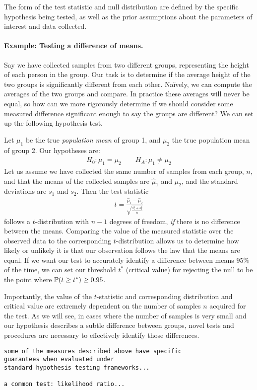 The form of the test statistic and null distribution
are defined by the specific hypothesis being tested,
as well as the prior assumptions about the parameters
of interest and data collected.

\paragraph{Example: Testing a difference of means.} 
Say we have collected samples from two different groups,
representing the height of each person in the group.
Our task is to determine if the average height
of the two groups is significantly different from each other.
Na\"ively, we can compute the averages of the two groups and compare.
In practice these averages will never be equal, so how can we 
more rigorously determine if we should consider some measured difference
significant enough to say the groups are different?
We can set up the following hypothesis test.

Let $\mu_1$ be the true \textit{population mean} of group 1,
and $\mu_2$ the true population mean of group 2.
Our hypotheses are:
\begin{align}
H_0: \mu_1 = \mu_2 \qquad H_A: \mu_1 \neq \mu_2
\end{align}
Let us assume we have collected the same number of samples from each group,
$n$, and that the means of the collected samples are $\hat{\mu}_1$ and $\hat{\mu}_2$,
and the standard deviations are $s_1$ and $s_2$.
Then the test statistic
\begin{align}
t = \frac{\hat{\mu}_1 - \hat{\mu}_2}{\sqrt{\frac{s_1^2 + s_2^2}{n}}}
\end{align}
follows a $t$-distribution with $n-1$ degrees of freedom,
\textit{if} there is no difference between the means.
Comparing the value of the measured statistic over the observed data
to the corresponding $t$-distribution allows
us to determine how likely or unlikely it is that 
our observation follows the law that the means are equal.
If we want our test to accurately identify
a difference between means 95\% of the time,
we can set our threshold $t^*$ (critical value) for rejecting the null
to be the point where $\mathbb{P}(t \geq t^*) \geq 0.95$.

Importantly, the value of the $t$-statistic and corresponding
distribution and critical value are extremely
dependent on the number of samples $n$ acquired for the test.
As we will see, in cases where the number of samples is 
very small and our hypothesis describes 
a subtle difference between groups,
novel tests and procedures are necessary
to effectively identify those differences.


\begin{verbatim}
some of the measures described above have specific 
guarantees when evaluated under
standard hypothesis testing frameworks...

a common test: likelihood ratio...
\end{verbatim}
